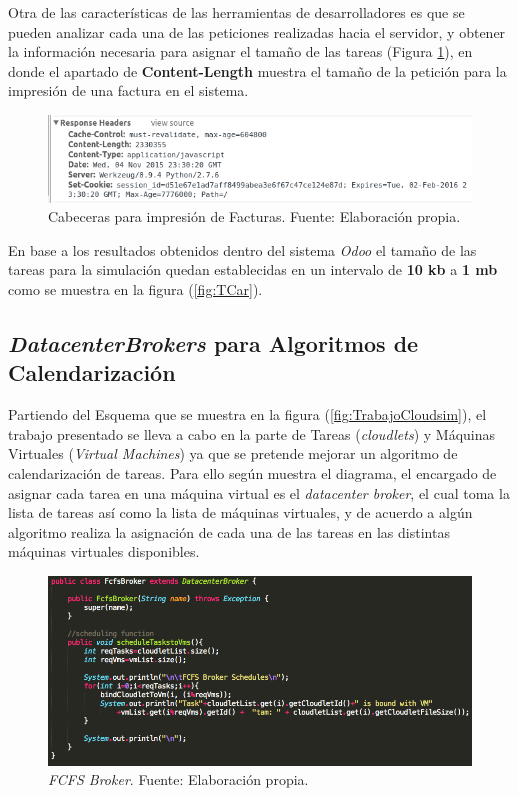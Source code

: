 Otra de las características de las herramientas de desarrolladores es que se pueden analizar cada una de las peticiones realizadas hacia el servidor, y obtener la información necesaria para asignar el tamaño de las tareas (Figura \ref{fig:HeaderRequest}), en donde el apartado de \textbf{Content-Length} muestra el tamaño de la petición para la impresión de una factura en el sistema.

\renewcommand\thefigure{\arabic{figure}}
\begin{figure}[h!]
	\centering
	\includegraphics[scale=0.5]{media/odoo/7}
	\caption{Cabeceras para impresión de Facturas. Fuente: Elaboración propia.}
	\label{fig:HeaderRequest}
\end{figure}

En base a los resultados obtenidos dentro del sistema \textit{Odoo} el tamaño de las tareas para la simulación quedan establecidas en un intervalo de \textbf{10 kb} a \textbf{1 mb} como se muestra en la figura (\ref{fig:TCar}).


\subsection*{\textit{DatacenterBrokers} para Algoritmos de Calendarización}

Partiendo del Esquema que se muestra en la figura (\ref{fig:TrabajoCloudsim}), el trabajo presentado se lleva a cabo en la parte de Tareas (\textit{cloudlets}) y M\'aquinas Virtuales (\textit{Virtual Machines}) ya que se pretende mejorar un algoritmo de calendarizaci\'on de tareas.
Para ello seg\'un muestra el diagrama, el encargado de asignar cada tarea en una m\'aquina virtual es el \textit{datacenter broker}, el cual toma la lista de tareas as\'i como la lista de m\'aquinas virtuales, y de acuerdo a alg\'un algoritmo realiza la asignaci\'on de cada una de las tareas en las distintas m\'aquinas virtuales disponibles.

\renewcommand\thefigure{\arabic{figure}}
\begin{figure}[h!]
	\centering
	\includegraphics[scale=0.4]{media/FCFS_broker}
	\caption{\textit{FCFS Broker}. Fuente: Elaboración propia.}
	\label{fig:fcfsBroker}
\end{figure}

